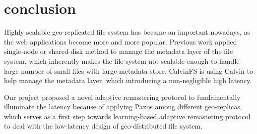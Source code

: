 \section{conclusion}
Highly scalable geo-replicated file system has became an important nowadays, as the web applications become more and more popular. Previous work applied single-node or shared-disk method to manage the metadata layer of the file system, which inherently makes the file system not scalable enough to handle large number of small files with large metadata store. CalvinFS is using Calvin to help manage the metadata layer, which introducing a non-negligible high latency. 

Our project proposed a novel adaptive remastering protocol to fundamentally illuminate the latency because of applying Paxos among different geo-replicas, which serves as a first step towards learning-based adaptive remastering protocol to deal with the low-latency design of geo-distributed file system.
